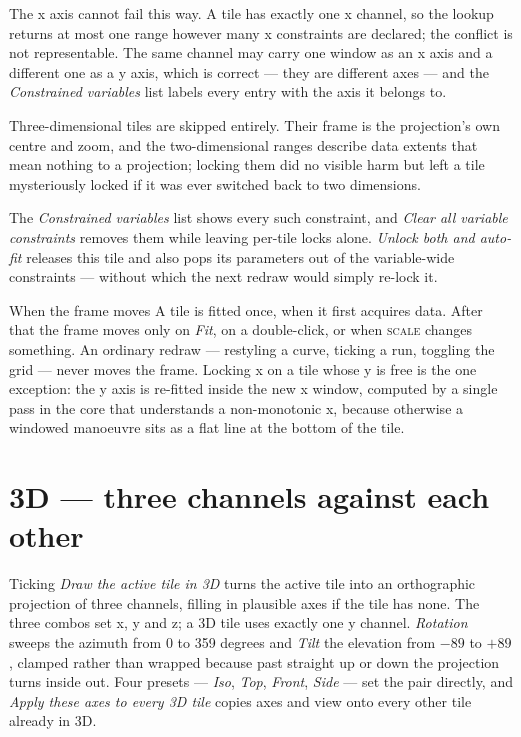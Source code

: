 \documentclass[11pt,a4paper,oneside]{report}
\newcommand{\tab}[1]{\textsc{#1}}
\begin{document}
The x axis cannot fail this way. A tile has exactly one x channel, so the lookup
returns at most one range however many x constraints are declared; the conflict
is not representable. The same channel may carry one window as an x axis and a
different one as a y axis, which is correct --- they are different axes --- and
the \emph{Constrained variables} list labels every entry with the axis it belongs
to.

Three-dimensional tiles are skipped entirely. Their frame is the projection's own
centre and zoom, and the two-dimensional ranges describe data extents that mean
nothing to a projection; locking them did no visible harm but left a tile
mysteriously locked if it was ever switched back to two dimensions.

The \emph{Constrained variables} list shows every such constraint, and \emph{Clear
all variable constraints} removes them while leaving per-tile locks alone.
\emph{Unlock both and auto-fit} releases this tile and also pops its parameters
out of the variable-wide constraints --- without which the next redraw would
simply re-lock it.

\begin{aoenote}{When the frame moves}
A tile is fitted once, when it first acquires data. After that the frame moves
only on \emph{Fit}, on a double-click, or when \tab{scale} changes something. An
ordinary redraw --- restyling a curve, ticking a run, toggling the grid --- never
moves the frame. Locking x on a tile whose y is free is the one exception: the y
axis is re-fitted inside the new x window, computed by a single pass in the core
that understands a non-monotonic x, because otherwise a windowed manoeuvre sits
as a flat line at the bottom of the tile.
\end{aoenote}

\section{3D --- three channels against each other}

Ticking \emph{Draw the active tile in 3D} turns the active tile into an
orthographic projection of three channels, filling in plausible axes if the tile
has none. The three combos set x, y and z; a 3D tile uses exactly one y channel.
\emph{Rotation} sweeps the azimuth from 0 to 359 degrees and \emph{Tilt} the
elevation from $-89$ to $+89$, clamped rather than wrapped because past straight
up or down the projection turns inside out. Four presets --- \emph{Iso},
\emph{Top}, \emph{Front}, \emph{Side} --- set the pair directly, and \emph{Apply
these axes to every 3D tile} copies axes and view onto every other tile already
in 3D.
\end{document}

